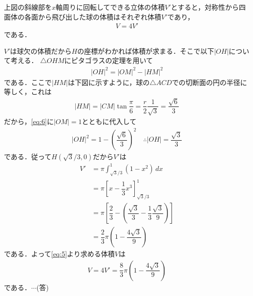 \documentclass[../../main.tex]{subfiles}
\begin{document}
上図の斜線部を$x$軸周りに回転してできる立体の体積$V'$とすると，対称性から四面体の各面から飛び出した球の体積はそれぞれ体積$V'$であり，
\begin{align}
  V = 4 V' \label{eq:5}
\end{align}
である．

$V'$は球欠の体積だから$H$の座標がわかれば体積が求まる．そこで以下$|OH|$について考える．
$\triangle OHM$にピタゴラスの定理を用いて
\begin{align}
  |OH|^2 = |OM|^2 - |HM|^2 \label{eq:6}
\end{align}
である．ここで$|HM|$は下図に示すように，球の$\triangle ACD$での切断面の円の半径に等しく，これは
\begin{align}
  |HM| = |CM|\tan\dfrac{\pi}{6} = \dfrac{r}{2}\dfrac{1}{\sqrt{3}} = \dfrac{\sqrt{6}}{3}
\end{align}
だから，\cref{eq:6}に$|OM|=1$とともに代入して
\begin{align}
  |OH|^2 = 1 - \left(\dfrac{\sqrt{6}}{3}\right)^2 \quad \therefore |OH| = \dfrac{\sqrt{3}}{3}
\end{align}
である．従って$H(\sqrt{3}/3,0)$だから$V'$は
\begin{align}
  V'&=\pi\int_{\sqrt{3}/3}^1(1-x^2)\,dx \\
  &=\pi\left[x-\dfrac{1}{3}x^3\right]_{\sqrt{3}/3}^{1} \\
  &=\pi\left[\dfrac{2}{3}-\left(\dfrac{\sqrt{3}}{3}-\dfrac{1}{3}\dfrac{\sqrt{3}}{9}\right)\right ]\\
  &=\dfrac{2}{3}\pi\left(1-\dfrac{4\sqrt{3}}{9}\right) \label{eq:7}
\end{align}
である．よって\cref{eq:5}より求める体積$V$は
\begin{align}
  V=4V'=\dfrac{8}{3}\pi\left(1-\dfrac{4\sqrt{3}}{9}\right)
\end{align}
である．$\cdots$(答)
\end{document}
